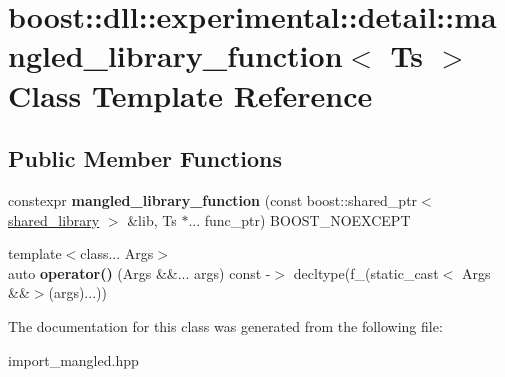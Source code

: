 \hypertarget{a01668}{}\section{boost\+:\+:dll\+:\+:experimental\+:\+:detail\+:\+:mangled\+\_\+library\+\_\+function$<$ Ts $>$ Class Template Reference}
\label{a01668}
\subsection*{Public Member Functions}
\begin{DoxyCompactItemize}
\item 
\mbox{\label{a01668_a9c37dee4ccbcfe7b40892103bd91341c}} 
constexpr {\bfseries mangled\+\_\+library\+\_\+function} (const boost\+::shared\+\_\+ptr$<$ \hyperlink{a01708}{shared\+\_\+library} $>$ \&lib, Ts $\ast$... func\+\_\+ptr) B\+O\+O\+S\+T\+\_\+\+N\+O\+E\+X\+C\+E\+PT
\item 
\mbox{\label{a01668_a07c16d1414de83157a53126b3dc6627d}} 
{\footnotesize template$<$class... Args$>$ }\\auto {\bfseries operator()} (Args \&\&... args) const -\/$>$ decltype(f\+\_\+(static\+\_\+cast$<$ Args \&\&$>$(args)...))
\end{DoxyCompactItemize}


The documentation for this class was generated from the following file\+:\begin{DoxyCompactItemize}
\item 
import\+\_\+mangled.\+hpp\end{DoxyCompactItemize}
